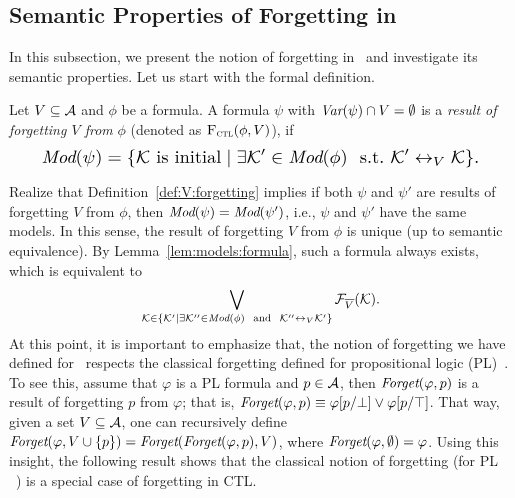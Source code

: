 \documentclass{article}
\begin{document}
\subsection{Semantic Properties of Forgetting in \CTL}
In this subsection, we present the notion of forgetting in \CTL\ and investigate its semantic properties. Let us start with the formal definition.
%
\begin{definition}[Forgetting]\label{def:V:forgetting}
  Let $V\subseteq\cal A$ and $\phi$ be a formula.
A formula $\psi$ with $\textit{Var}(\psi)\cap V=\emptyset$
is a {\em result of forgetting $V$ from} $\phi$ (denoted as ${\textsc{F}_{\textsc{ctl}}}(\phi,V)$), if
\begin{equation*}
\resizebox{.91\linewidth}{!}{$
\displaystyle
  \Mod(\psi)=\{{\cal K}\mbox{ is initial}\mid \exists {\cal K}'\in\Mod(\phi)\ \text{ \st }\ {\cal K}'\lrto_V{\cal K}\}.
  $}
\end{equation*}
\end{definition}
Realize that Definition~\ref{def:V:forgetting} implies if both $\psi$ and $\psi'$ are results of forgetting $V$ from $\phi$, then
$\textit{Mod}(\psi)=\textit{Mod}(\psi')$, i.e., $\psi$ and $\psi'$ have the same models. In this sense, the result of  forgetting $V$ from $\phi$ is unique (up to semantic equivalence).
By Lemma~\ref{lem:models:formula}, such a formula always exists, which
is equivalent to
\begin{equation*}
  \bigvee_{{\cal K}\in  \{{\cal K}'\mid \exists {\cal K}''\in\textit{Mod}(\phi)\ \text{ and }\ {\cal K}''\leftrightarrow_V{\cal K}'\}} {\cal F}_{\overline V}({\cal K}).
\end{equation*}
At this point, it is important to emphasize that, the notion of forgetting  we have defined for \CTL\ respects the classical forgetting defined for propositional logic (PL)~\cite{lin1994forget}. To see this, assume that $\varphi$ is a PL formula and $p\in {\cal A}$, then $\textit{Forget}(\varphi, p)$ is a result of forgetting $p$ from $\varphi$; that is, $\textit{Forget}(\varphi, p)\equiv \varphi[p/\bot] \vee \varphi[p/\top]$.
That way, given a set $V\subseteq {\cal A}$, one can recursively define $\textit{Forget}(\varphi, V\cup \{p\}) = \textit{Forget}(\textit{Forget}(\varphi, p),V)$, where $\textit{Forget}(\varphi, \emptyset) = \varphi$. Using this insight, the following result shows that the classical notion of forgetting (for PL ~\cite{lin1994forget}) is a special case of forgetting in CTL.
\end{document}
